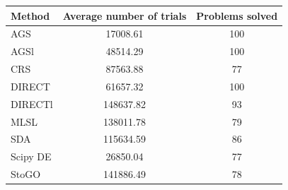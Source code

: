 \documentclass[a4paper]{article}
\begin{document}
\begin{tabular}{lcc}
\hline
 Method   &  Average number of trials  &  Problems solved  \\
\hline
 AGS      &          17008.61          &        100        \\
 AGSl     &          48514.29          &        100        \\
 CRS      &          87563.88          &        77         \\
 DIRECT   &          61657.32          &        100        \\
 DIRECTl  &         148637.82          &        93         \\
 MLSL     &         138011.78          &        79         \\
 SDA      &         115634.59          &        86         \\
 Scipy DE &          26850.04          &        77         \\
 StoGO    &         141886.49          &        78         \\
\hline
\end{tabular}
\end{document}
